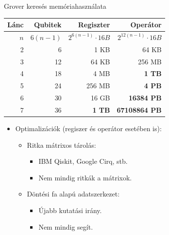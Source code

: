 \documentclass[aspectratio=169]{beamer}
\begin{document}
\begin{frame}[t]{Grover keresés memóriahasználata}
\vspace{2mm}
\begin{tabular}{r|r|r|r}
Lánc & Qubitek & Regiszter & Operátor \\
\hline
\rule{0pt}{1.05\normalbaselineskip} $n$ & $6(n-1)$ & $2^{6(n-1)} \cdot{} 16 B$ & ${2^{12(n-1)}} \cdot{} 16 B$  \pause{} \\
\hline
2 & 6 &  1 KB &  64 KB \\
3 & 12 &  64 KB &  256 MB \\
4 & 18 &  4 MB & \color{red} \textbf{1 TB} \\
5 & 24 &  256 MB & \color{red} \textbf{4 PB} \\
6 & 30 &  16 GB & \color{red} \textbf{16384 PB} \\
7 & 36 & \color{red} \textbf{1 TB} & \color{red} \textbf{67108864 PB}
\end{tabular}
\pause
\vspace{2mm}
\begin{itemize}
    \item Optimalizációk (regiszer és operátor esetében is):
    \begin{itemize}
        \item Ritka mátrixos tárolás:
        \begin{itemize}
          \item IBM Qiskit, Google Cirq, stb.
          \item Nem mindig ritkák a mátrixok.
        \end{itemize}
        \item Döntési fa alapú adatszerkezet:
        \begin{itemize}
            \item Újabb kutatási irány.
            \item Nem mindig segít.
        \end{itemize}
    \end{itemize}
\end{itemize}

\end{frame}

\end{document}
